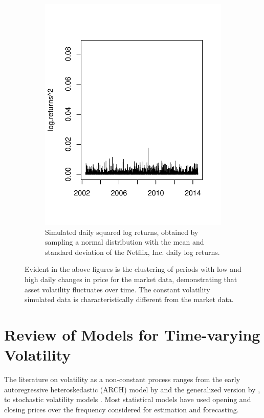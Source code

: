 \begin{figure}[htbp]
\begin{subfigure}[t]{0.4\textwidth}
                \includegraphics[width=\textwidth]{./chapter-1-introduction/Netflix-daily-squared-log-returns-constant-vol.pdf}
                \caption{Simulated daily squared log returns, obtained by sampling a normal distribution with the mean and standard deviation of the Netflix, Inc. daily log returns. }
                \label{fig:netflix-returns-constant-vol}
        \end{subfigure}
	\caption{Evident in the above figures is the clustering of periods with low and high daily changes in price for the market data, demonstrating that asset volatility fluctuates over time. The constant volatility simulated data is characteristically different from the market data.}
	\label{fig:squared-log-returns}
\end{figure}

\section{Review of Models for Time-varying Volatility}
The literature on volatility as a non-constant process ranges from the early autoregressive 
heteroskedastic (ARCH) model by \cite{engle1982} and the generalized version by \cite{bollerslev1986},
to stochastic volatility models \citep*{hull1987pricing}. Most statistical models 
have used opening and closing prices over the frequency considered for estimation and forecasting.

